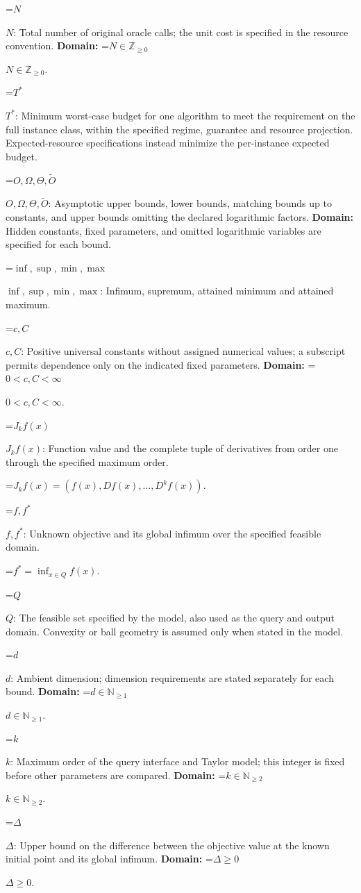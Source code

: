 \documentclass[10pt,a4paper]{article}
\newcommand{\AtlasMath}[1]{\par\begingroup\centering\setbox0=\hbox{$\displaystyle #1$}\ifdim\wd0>1.4\linewidth\typeout{ATLAS WIDE FORMULA: \the\wd0}\fi\ifdim\wd0>\linewidth\resizebox{\linewidth}{!}{\box0}\else\box0\fi\par\endgroup}
\newcommand{\AtlasInlineMath}[1]{\begingroup\setbox0=\hbox{$#1$}\ifdim\wd0>.4\linewidth\endgroup\AtlasMath{#1}\else\endgroup$#1$\fi}
\begin{document}
\AtlasInlineMath{N}: Total number of original oracle calls; the unit cost is specified in the resource convention. \textbf{Domain:} \AtlasInlineMath{N\in\mathbb{Z}_{\ge0}}.

\AtlasInlineMath{T^*}: Minimum worst-case budget for one algorithm to meet the requirement on the full instance class, within the specified regime, guarantee and resource projection. Expected-resource specifications instead minimize the per-instance expected budget.

\AtlasInlineMath{O,\Omega,\Theta,\widetilde{O}}: Asymptotic upper bounds, lower bounds, matching bounds up to constants, and upper bounds omitting the declared logarithmic factors. \textbf{Domain:} Hidden constants, fixed parameters, and omitted logarithmic variables are specified for each bound.

\AtlasInlineMath{\inf,\sup,\min,\max}: Infimum, supremum, attained minimum and attained maximum.

\AtlasInlineMath{c,C}: Positive universal constants without assigned numerical values; a subscript permits dependence only on the indicated fixed parameters. \textbf{Domain:} \AtlasInlineMath{0<c,C<\infty}.

\AtlasInlineMath{J_{k}f(x)}: Function value and the complete tuple of derivatives from order one through the specified maximum order.


\AtlasMath{J_{k}f(x)=(f(x),Df(x),\ldots,D^{k}f(x)).}


\AtlasInlineMath{f,f^*}: Unknown objective and its global infimum over the specified feasible domain.


\AtlasMath{f^*=\inf_{x\in Q}f(x).}


\AtlasInlineMath{Q}: The feasible set specified by the model, also used as the query and output domain. Convexity or ball geometry is assumed only when stated in the model.

\AtlasInlineMath{d}: Ambient dimension; dimension requirements are stated separately for each bound. \textbf{Domain:} \AtlasInlineMath{d\in\mathbb{N}_{\ge1}}.

\AtlasInlineMath{k}: Maximum order of the query interface and Taylor model; this integer is fixed before other parameters are compared. \textbf{Domain:} \AtlasInlineMath{k\in\mathbb{N}_{\ge2}}.

\AtlasInlineMath{\Delta}: Upper bound on the difference between the objective value at the known initial point and its global infimum. \textbf{Domain:} \AtlasInlineMath{\Delta\ge0}.
\end{document}
